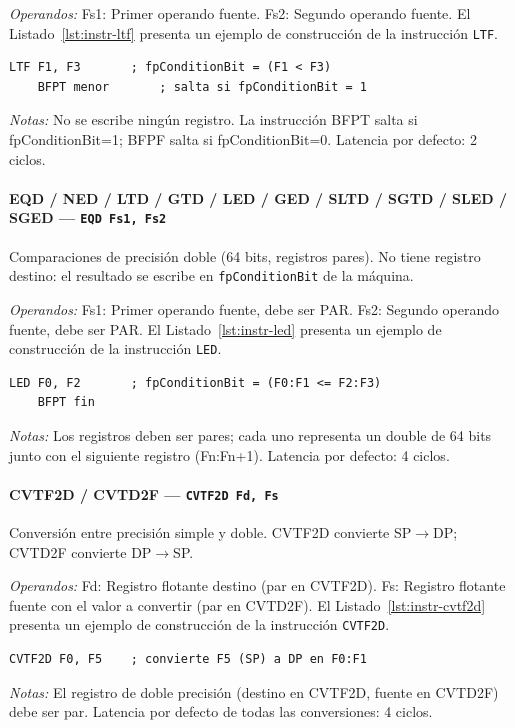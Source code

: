 \documentclass[../main.tex]{subfiles}
\begin{document}
\textit{Operandos:} Fs1: Primer operando fuente. Fs2: Segundo operando fuente.
El Listado~\ref{lst:instr-ltf} presenta un ejemplo de construcción de la instrucción \texttt{LTF}.

\begin{lstlisting}[caption={LTF},label={lst:instr-ltf}]
	LTF F1, F3       ; fpConditionBit = (F1 < F3)
	BFPT menor       ; salta si fpConditionBit = 1
\end{lstlisting}
\textit{Notas:} No se escribe ningún registro. La instrucción BFPT salta si fpConditionBit=1; BFPF salta si fpConditionBit=0. Latencia por defecto: 2 ciclos.

\paragraph*{EQD / NED / LTD / GTD / LED / GED / SLTD / SGTD / SLED / SGED --- \texttt{EQD Fs1, Fs2}}
Comparaciones de precisión doble (64 bits, registros pares). No tiene registro destino: el resultado se escribe en \texttt{fpConditionBit} de la máquina.

\textit{Operandos:} Fs1: Primer operando fuente, debe ser PAR. Fs2: Segundo operando fuente, debe ser PAR.
El Listado~\ref{lst:instr-led} presenta un ejemplo de construcción de la instrucción \texttt{LED}.

\begin{lstlisting}[caption={LED},label={lst:instr-led}]
	LED F0, F2       ; fpConditionBit = (F0:F1 <= F2:F3)
	BFPT fin
\end{lstlisting}
\textit{Notas:} Los registros deben ser pares; cada uno representa un double de 64 bits junto con el siguiente registro (Fn:Fn+1). Latencia por defecto: 4 ciclos.

\paragraph*{CVTF2D / CVTD2F --- \texttt{CVTF2D Fd, Fs}}
Conversión entre precisión simple y doble. CVTF2D convierte SP$\to$DP; CVTD2F convierte DP$\to$SP.

\textit{Operandos:} Fd: Registro flotante destino (par en CVTF2D). Fs: Registro flotante fuente con el valor a convertir (par en CVTD2F).
El Listado~\ref{lst:instr-cvtf2d} presenta un ejemplo de construcción de la instrucción \texttt{CVTF2D}.

\begin{lstlisting}[caption={CVTF2D},label={lst:instr-cvtf2d}]
	CVTF2D F0, F5    ; convierte F5 (SP) a DP en F0:F1
\end{lstlisting}
\textit{Notas:} El registro de doble precisión (destino en CVTF2D, fuente en CVTD2F) debe ser par. Latencia por defecto de todas las conversiones: 4 ciclos.
\end{document}
